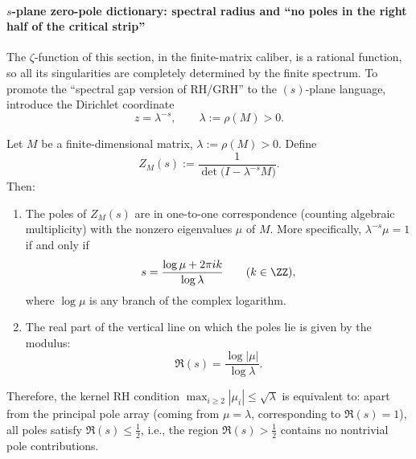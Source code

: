 \paragraph{\texorpdfstring{$s$}{s}-plane zero-pole dictionary: spectral radius and ``no poles in the right half of the critical strip''}\label{par:s-plane-pole-dictionary}
The \(\zeta\)-function of this section, in the finite-matrix caliber, is a rational function, so all its singularities are completely determined by the finite spectrum.
To promote the ``spectral gap version of RH/GRH'' to the \((s)\)-plane language, introduce the Dirichlet coordinate
\[
z=\lambda^{-s},\qquad \lambda:=\rho(M)>0.
\]
\begin{remark}\label{prop:s-plane-spectrum-poles}
Let \(M\) be a finite-dimensional matrix, \(\lambda:=\rho(M)>0\). Define
\[
Z_M(s):=\frac{1}{\det\!\bigl(I-\lambda^{-s}M\bigr)}.
\]
Then:
\begin{enumerate}
  \item The poles of \(Z_M(s)\) are in one-to-one correspondence (counting algebraic multiplicity) with the nonzero eigenvalues \(\mu\) of \(M\). More specifically, \(\lambda^{-s}\mu=1\) if and only if
  \[
  s=\frac{\log\mu+2\pi i k}{\log\lambda}\qquad(k\in\ZZ),
  \]
  where \(\log\mu\) is any branch of the complex logarithm.
  \item The real part of the vertical line on which the poles lie is given by the modulus:
  \[
  \Re(s)=\frac{\log|\mu|}{\log\lambda}.
  \]
\end{enumerate}
Therefore, the kernel RH condition
\(
\max_{i\ge 2}|\mu_i|\le \sqrt{\lambda}
\)
is equivalent to: apart from the principal pole array (coming from \(\mu=\lambda\), corresponding to \(\Re(s)=1\)), all poles satisfy \(\Re(s)\le \tfrac12\), i.e., the region \(\Re(s)>\tfrac12\) contains no nontrivial pole contributions.
\end{remark}

